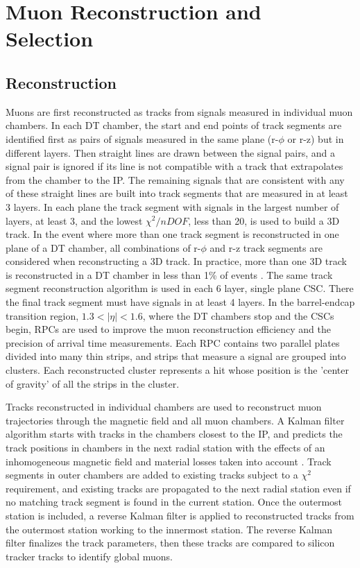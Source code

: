 \section{Muon Reconstruction and Selection}
\label{sec:muReco}

\subsection{Reconstruction}
Muons are first reconstructed as tracks from signals measured in individual muon chambers.  In each DT chamber, the start and end points of 
track segments are identified first as pairs of signals measured in the same plane (r-$\phi$ or r-z) but in different layers.  Then straight 
lines are drawn between the signal pairs, and a signal pair is ignored if its line is not compatible with a track that extrapolates from 
the chamber to the IP.  The remaining signals that are consistent with any of these straight lines are built into track segments that are 
measured in at least 3 layers.  In each plane the track segment with signals in the largest number of layers, at least 3, and the lowest 
$\chi^{2}/nDOF$, less than 20, is used to build a 3D track.  In the event where more than one track segment is reconstructed 
in one plane of a DT chamber, all combinations of r-$\phi$ and r-z track segments are considered when reconstructing a 3D track.  In 
practice, more than one 3D track is reconstructed in a DT chamber in less than 1\% of events \cite{cmsTdrPhysPerformance}.  The same 
track segment reconstruction algorithm is used in each 6 layer, single plane CSC.  There the final track segment must have signals 
in at least 4 layers.  In the barrel-endcap transition region, $1.3 < |\eta| < 1.6$, where the DT chambers stop and the CSCs begin, RPCs 
are used to improve the muon reconstruction efficiency and the precision of arrival time measurements.  Each RPC contains two parallel 
plates divided into many thin strips, and strips that measure a signal are grouped into clusters.  Each reconstructed cluster represents 
a hit whose position is the 'center of gravity' of all the strips in the cluster.

Tracks reconstructed in individual chambers are used to reconstruct muon trajectories through the magnetic field and all muon chambers.  
A Kalman filter algorithm starts with tracks in the chambers closest to the IP, and predicts the track positions in chambers in the next 
radial station with the effects of an inhomogeneous magnetic field and material losses taken into account \cite{muonRecoFirstCollisions}.  
Track segments in outer chambers are added to existing tracks subject to a $\chi^{2}$ requirement, and existing tracks are propagated to 
the next radial station even if no matching track segment is found in the current station.  Once the outermost station is included, a 
reverse Kalman filter is applied to reconstructed tracks from the outermost station working to the innermost station.  The reverse Kalman 
filter finalizes the track parameters, then these tracks are compared to silicon tracker tracks to identify global muons.

